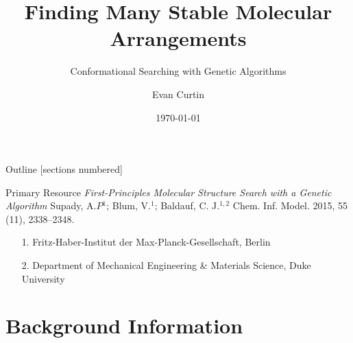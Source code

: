 \documentclass[10pt]{beamer}
\title{Finding Many Stable Molecular Arrangements}
\subtitle{Conformational Searching with Genetic Algorithms}
\date{\today}
\author{Evan Curtin}
\institute{University of Illinois at Urbana-Champaign}
\begin{document}
\maketitle

\begin{frame}{Outline}
  [sections numbered]
  \tableofcontents[hideallsubsections]
\end{frame}


\begin{frame}[fragile]{Primary Resource}
    \emph{First-Principles Molecular Structure Search with a Genetic Algorithm}
    Supady, A.$P{}^1$; Blum, V.${}^1$; Baldauf, C. J.${}^{1,2}$ Chem. Inf. Model. 2015, 55 (11), 2338–2348.
    
    \begin{itemize}
        \item[1.] Fritz-Haber-Institut der Max-Planck-Gesellschaft, Berlin
        \item[2.] Department of Mechanical Engineering \& Materials Science, Duke University
    \end{itemize}
\end{frame}



\section{Background Information}
\end{document}
